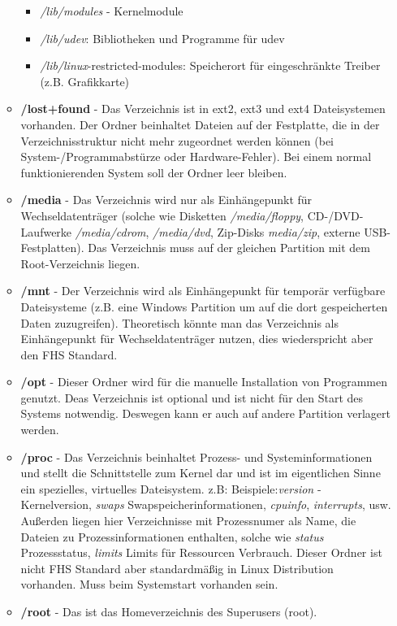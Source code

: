 \begin{itemize}
\begin{itemize}
			\begin{itemize}
				\item \textit{/lib/modules} - Kernelmodule
				\item \textit{/lib/udev}: Bibliotheken und Programme für udev
				\item \textit{/lib/linux}-restricted-modules: Speicherort für eingeschränkte Treiber (z.B. Grafikkarte)
			\end{itemize}
			\item \textbf{/lost+found} - Das Verzeichnis ist in ext2, ext3 und ext4 Dateisystemen vorhanden.
			Der Ordner beinhaltet Dateien auf der Festplatte,
			die in der Verzeichnisstruktur nicht mehr zugeordnet werden können (bei System-/Programmabstürze oder Hardware-Fehler).
			Bei einem normal funktionierenden System soll der Ordner leer bleiben.
			\item \textbf{/media} - Das Verzeichnis wird nur als Einhängepunkt für Wechseldatenträger
			(solche wie Disketten \textit{/media/floppy}, CD-/DVD-Laufwerke \textit{/media/cdrom},
			\textit{/media/dvd}, Zip-Disks \textit{media/zip}, externe USB-Festplatten).
			Das Verzeichnis muss auf der gleichen Partition mit dem Root-Verzeichnis liegen.
			\item \textbf{/mnt} - Der Verzeichnis wird als Einhängepunkt für temporär verfügbare Dateisysteme
			(z.B. eine Windows Partition um auf die dort gespeicherten Daten zuzugreifen). Theoretisch könnte man
			das Verzeichnis als Einhängepunkt für Wechseldatenträger nutzen, dies wiederspricht aber den
			FHS Standard.
			\item \textbf{/opt} - Dieser Ordner wird für die manuelle Installation von Programmen genutzt.
			Deas Verzeichnis ist optional und ist nicht für den Start des Systems notwendig.
			Deswegen kann er auch auf andere Partition verlagert werden.
			\item \textbf{/proc} - Das Verzeichnis beinhaltet Prozess- und Systeminformationen und stellt die Schnittstelle zum Kernel dar
			und ist im eigentlichen Sinne ein spezielles, virtuelles Dateisystem.
			z.B: Beispiele:\textit{version} - Kernelversion, \textit{swaps} Swapspeicherinformationen, \textit{cpuinfo}, \textit{interrupts}, usw.
			Außerden liegen hier Verzeichnisse mit Prozessnumer als Name, die Dateien zu Prozessinformationen enthalten, solche wie
			\textit{status} Prozessstatus, \textit{limits} Limits für Ressourcen Verbrauch.
			Dieser Ordner ist nicht FHS Standard aber standardmäßig in Linux Distribution vorhanden. Muss beim Systemstart vorhanden sein.
			\item \textbf{/root} - Das ist das Homeverzeichnis des Superusers (root).

\end{itemize}
\end{itemize}

